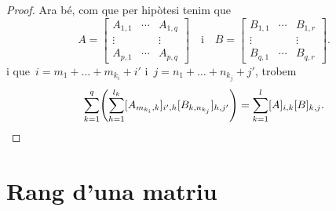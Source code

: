 \documentclass[../../Main.tex]{subfiles}
\begin{document}
\begin{proposition}
\begin{proof}
			Ara bé, com que per hipòtesi tenim que
			\[A=\left[\begin{matrix}
			A_{1,1} & \cdots & A_{1,q} \\
			\vdots & & \vdots \\
			A_{p,1} & \cdots & A_{p,q}
			\end{matrix}\right]\quad\text{i}\quad B=\left[\begin{matrix}
			B_{1,1} & \cdots & B_{1,r} \\
			\vdots & & \vdots \\
			B_{q,1} & \cdots & B_{q,r}
			\end{matrix}\right].\]
			i que~\(i=m_{1}+\dots+m_{k_{i}}+i'\) i~\(j=n_{1}+\dots+n_{k_{j}}+j'\), trobem
			\[
			    \sum_{k=1}^{q}\left(\sum_{h=1}^{l_{k}}[A_{m_{k_{i}},k}]_{i',h}[B_{k,n_{k_{j}}}]_{h,j'}\right)=\sum_{k=1}^{l}[A]_{i,k}[B]_{k,j}.\qedhere
			\]
		\end{proof}
	\end{proposition}
\section{Rang d'una matriu}
\end{document}
